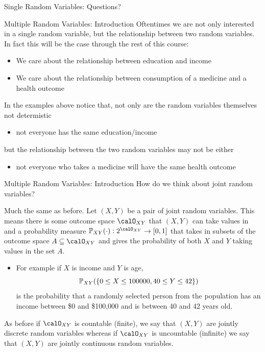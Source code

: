 \documentclass[notheorems,9pt]{beamer}
\begin{document}
\begin{frame}{Single Random Variables: Questions?} 
	\label{frame:srv-q2}
	\centering
\end{frame}
\begin{frame}{Multiple Random Variables: Introduction} 
	\label{frame:mrv-intro1}
	Oftentimes we are not only interested in a single random variable, but the relationship between two random variables. In fact this will be the case through the rest of this course:
	\begin{itemize}
		\item We care about the relationship between education and income
		\item We care about the relationship between consumption of a medicine and a health outcome
	\end{itemize}
	In the examples above notice that, not only are the random variables themselves not determistic 
	\begin{itemize}
		\item not everyone has the same education/income
	\end{itemize}
	but the relationship between the two random variables may not be either
	\begin{itemize}
		\item not everyone who takes a medicine will have the same health outcome
	\end{itemize}
\end{frame}
\begin{frame}{Multiple Random Variables: Introduction} 
	\label{frame:mrv-intro2}
	 How do we think about joint random variables?

	 Much the same as before. Let \((X,Y)\) be a pair of joint random variables. This means there is some outcome space \(\calO_{XY}\) that \((X,Y)\) can take values in and a probability measure \(\P_{XY}(\cdot): 2^{\calO_{XY}}\to[0,1]\) that takes in subsets of the outcome space \(A\subseteq \calO_{XY}\) and gives the probability of both \(X\) and \(Y\) taking values in the set \(A\).
	\begin{itemize}
		\item For example if \(X\) is income and \(Y\) is age, \[\P_{XY}(\{0\leq X\leq 100000, 40\leq Y\leq 42\})\] is the probability that a randomly selected person from the population has an income between \$0 and \$100,000 and is between 40 and 42 years old.
	\end{itemize}
	As before if \(\calO_{XY}\) is countable (finite), we say that \((X,Y)\) are jointly discrete random variables whereas if \(\calO_{XY}\) is uncountable (infinite) we say that \((X,Y)\) are jointly continuous random variables.
\end{frame}
\end{document}
